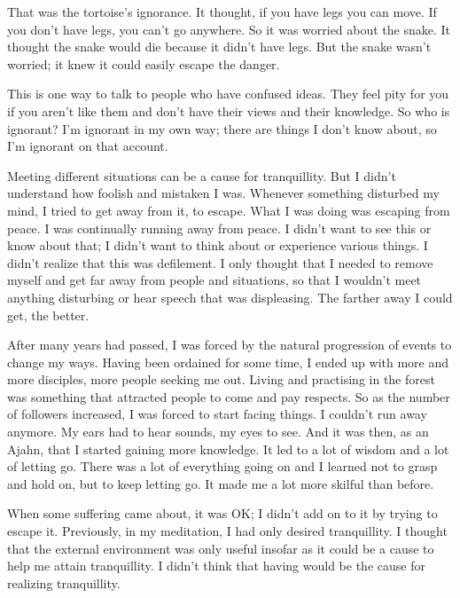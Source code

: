 That was the tortoise's ignorance. It thought, if you have legs you can move. If you don't have legs, you can't go anywhere. So it was worried about the snake. It thought the snake would die because it didn't have legs. But the snake wasn't worried; it knew it could easily escape the danger.

This is one way to talk to people who have confused ideas. They feel pity for you if you aren't like them and don't have their views and their knowledge. So who is ignorant? I'm ignorant in my own way; there are things I don't know about, so I'm ignorant on that account.

Meeting different situations can be a cause for tranquillity. But I didn't understand how foolish and mistaken I was. Whenever something disturbed my mind, I tried to get away from it, to escape. What I was doing was escaping from peace. I was continually running away from peace. I didn't want to see this or know about that; I didn't want to think about or experience various things. I didn't realize that this was defilement. I only thought that I needed to remove myself and get far away from people and situations, so that I wouldn't meet anything disturbing or hear speech that was displeasing. The farther away I could get, the better.

After many years had passed, I was forced by the natural progression of events to change my ways. Having been ordained for some time, I ended up with more and more disciples, more people seeking me out. Living and practising in the forest was something that attracted people to come and pay respects. So as the number of followers increased, I was forced to start facing things. I couldn't run away anymore. My ears had to hear sounds, my eyes to see. And it was then, as an Ajahn, that I started gaining more knowledge. It led to a lot of wisdom and a lot of letting go. There was a lot of everything going on and I learned not to grasp and hold on, but to keep letting go. It made me a lot more skilful than before.

When some suffering came about, it was OK; I didn't add on to it by trying to escape it. Previously, in my meditation, I had only desired tranquillity. I thought that the external environment was only useful insofar as it could be a cause to help me attain tranquillity. I didn't think that having  would be the cause for realizing tranquillity.

